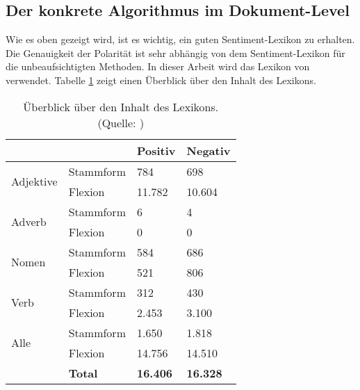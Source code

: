 \subsection{Der konkrete Algorithmus im Dokument-Level}  \label{algorithmus}
Wie es oben gezeigt wird, ist es wichtig, ein guten Sentiment-Lexikon zu erhalten. Die Genauigkeit der Polarität ist sehr abhängig von dem Sentiment-Lexikon für die unbeaufsichtigten Methoden. In dieser Arbeit wird das Lexikon von \citet{Remus2010} verwendet. Tabelle \ref{tab:LexikonInhalt} zeigt einen Überblick über den Inhalt des Lexikons.
\begin{table}[htb]
\centering
\begin{tabular}{|l|l|l|l|}
\hline
                                                 &                & Positiv         & Negativ         \\ \hline
\multicolumn{1}{|c|}{\multirow{2}{*}{Adjektive}} & Stammform      & 784             & 698             \\ \cline{2-4} 
\multicolumn{1}{|c|}{}                           & Flexion        & 11.782          & 10.604          \\ \hline
\multirow{2}{*}{Adverb}                          & Stammform      & 6               & 4               \\ \cline{2-4} 
                                                 & Flexion        & 0               & 0               \\ \hline
\multirow{2}{*}{Nomen}                           & Stammform      & 584             & 686             \\ \cline{2-4} 
                                                 & Flexion        & 521             & 806             \\ \hline
\multirow{2}{*}{Verb}                            & Stammform      & 312             & 430             \\ \cline{2-4} 
                                                 & Flexion        & 2.453           & 3.100           \\ \hline
\multirow{2}{*}{Alle}                            & Stammform      & 1.650           & 1.818           \\ \cline{2-4} 
                                                 & Flexion        & 14.756          & 14.510          \\ \hline
\textbf{}                                        & \textbf{Total} & \textbf{16.406} & \textbf{16.328} \\ \hline
\end{tabular}
\caption[Überblick über den Inhalt des Lexikons]{Überblick über den Inhalt des Lexikons. (Quelle: \citealp{Remus2010})}
\label{tab:LexikonInhalt}
\end{table}

